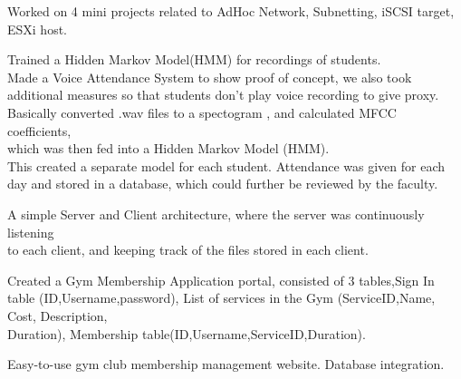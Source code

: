 \documentclass[]{deedy-resume-openfont}
\begin{document}


\textbullet{} Worked on 4 mini projects related to AdHoc Network, Subnetting, iSCSI target,\\ESXi host.

\textbullet{} Trained a Hidden Markov Model(HMM) for recordings of students.\\
\textbullet{} Made a Voice Attendance System to show proof of concept, we also took \\additional measures so that students don't play voice recording to give proxy.\\
\textbullet{} Basically converted .wav files to a spectogram , and calculated MFCC coefficients,\\ which was then fed into a Hidden Markov Model (HMM).\\
\textbullet{} This created a separate model for each student. Attendance was given for each day and stored in a database, which could further be reviewed by the faculty.




\textbullet{} A simple Server and Client architecture, where the server was continuously listening \\to each client, and keeping track of the files stored in each client.



\textbullet{} Created a Gym Membership Application portal,
consisted of 3 tables,Sign In table (ID,Username,password), 
List of services in the Gym (ServiceID,Name, Cost, Description,  \\Duration), Membership table(ID,Username,ServiceID,Duration). 



\textbullet{} Easy-to-use gym club membership management website. \textbullet{} Database integration.
\end{document}
